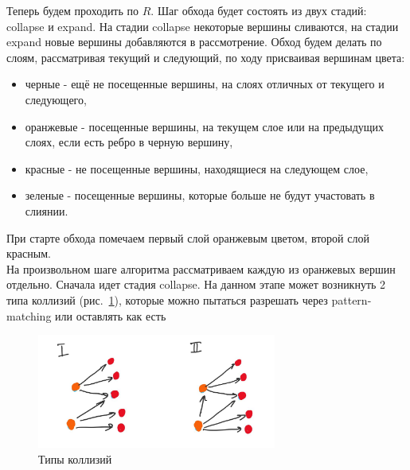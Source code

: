 \begin{algo}
Теперь будем проходить по $R$. Шаг обхода будет состоять из двух стадий: collapse и expand. На стадии collapse некоторые вершины сливаются, на стадии expand новые вершины добавляются в рассмотрение. Обход будем делать по слоям, рассматривая текущий и следующий, по ходу присваивая вершинам цвета:\\
\begin{itemize}
    \item черные - ещё не посещенные вершины, на слоях отличных от текущего и следующего,
    \item оранжевые - посещенные вершины, на текущем слое или на предыдущих слоях, если есть ребро в черную вершину,
    \item красные - не посещенные вершины, находящиеся на следующем слое,
    \item зеленые - посещенные вершины, которые больше не будут участовать в слиянии.
\end{itemize}
При старте обхода помечаем первый слой оранжевым цветом, второй слой красным.\\
На произвольном шаге алгоритма рассматриваем каждую из оранжевых вершин отдельно. Сначала идет стадия collapse. На данном этапе может возникнуть 2 типа коллизий (рис.~\ref{fig:collision}), которые можно пытаться разрешать через pattern-matching или оставлять как есть\\
\begin{figure}[h]
    \centering
    \includegraphics[width=0.7\textwidth]{img/collision.jpeg}
    \caption{Типы коллизий}
    \label{fig:collision}
\end{figure}


\end{algo}
